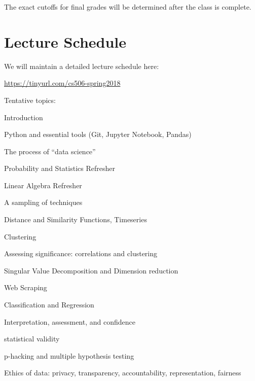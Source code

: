 \documentclass[11pt]{article}
\begin{document}
The exact cutoffs for final grades will be determined after the class is
complete.

\section*{Lecture Schedule}

We will maintain a detailed lecture schedule here: 

\begin{center}
  \url{https://tinyurl.com/cs506-spring2018}
\end{center}
\noindent 
Tentative topics:
\begin{compactitem}
\item Introduction
  \begin{compactitem}
\item Python and essential tools (Git, Jupyter Notebook, Pandas)
  \item The process of ``data science''
  \item Probability and Statistics Refresher
  \item Linear Algebra Refresher
  \end{compactitem}
\item A sampling of techniques
  \begin{compactitem}
\item Distance and Similarity Functions, Timeseries
  \item Clustering
  \item Assessing significance: correlations and clustering
  \item Singular Value Decomposition and Dimension reduction
  \item Web Scraping
  \item Classification and Regression
  \end{compactitem}
\item Interpretation, assessment, and confidence
  \begin{compactitem}
  \item statistical validity
  \item p-hacking and multiple hypothesis testing
  \end{compactitem}
\item Ethics of data: privacy, transparency, accountability, representation, fairness


\end{compactitem}
\end{document}
